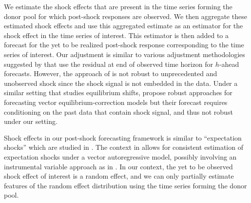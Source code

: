 \documentclass[11pt,3p,review,authoryear]{elsarticle}
\theoremstyle{definition}
\begin{document}
We estimate the shock effects that are present in the time series forming the donor pool for which post-shock responses are observed. We then aggregate these estimated shock effects and use this aggregated estimate as an estimator for the shock effect in the time series of interest. This estimator is then added to a forecast for the yet to be realized post-shock response corresponding to the time series of interest. Our adjustment is similar to various adjustment methodologies suggested by \cite{clements1996intercept} that use the residual at end of observed time horizon for $h$-ahead forecasts. However, the approach of \cite{clements1996intercept} is not robust to unprecedented and unobserved shock since the shock signal is not embedded in the data. Under a similar setting that studies equilibrium shifts, \cite{castle2015robust} propose robust approaches for forecasting vector equilibrium-correction models but their forecast requires  conditioning on  the past data that contain shock signal, and thus not robust under our setting.


Shock effects in our post-shock forecasting framework is similar to ``expectation shocks'' which are studied in \cite{clements2019measuring}. The context in \cite{clements2019measuring} allows for consistent estimation of expectation shocks under a vector autoregressive model, possibly involving an instrumental variable approach as in \cite{croushore2006data}. In our context, the yet to be observed shock effect of interest is a random effect, and we can only partially estimate features of the random effect distribution using the time series forming the donor pool. 
\end{document}
